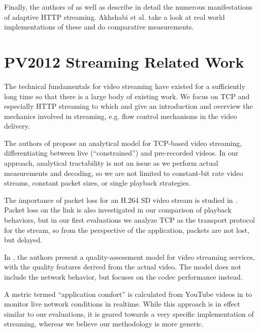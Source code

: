 Finally, the authors of \cite{ma2011mobile} as well as \cite{5677508} describe in detail the numerous manifestations of adaptive HTTP streaming. Akhshabi et al. \cite{akhshabi2011experimental} take a look at real world implementations of these and do comparative measurements.



\section{PV2012 Streaming Related Work}


The technical fundamentals for video streaming have existed for a sufficiently long time so that there is a large body of existing work. We focus on TCP and especially HTTP streaming to which \cite{watching-video1} and \cite{mobile-video} give an introduction and overview the mechanics involved in streaming, e.g. flow control mechanisms in the video delivery.


The authors of \cite{wang2003model} propose an analytical model for TCP-based video streaming, differentiating between live (``constrained'') and pre-recorded videos. In our approach, analytical tractability is not an issue as we perform actual measurements and decoding, so we are not limited to constant-bit rate video streams, constant packet sizes, or single playback strategies.

The importance of packet loss for an H.264 SD video stream is studied in \cite{pv2010loss}. Packet loss on the link is also investigated in our comparison of playback behaviors, but in our first evaluations we analyze TCP as the transport protocol for the stream, so from the perspective of the application, packets are not lost, but delayed.


In \cite{pv2010qoe}, the authors present a quality-assessment model for video streaming services, with the quality features derived from the actual video. The model does not include the network behavior, but focuses on the codec performance instead. 

A metric termed ``application comfort'' is calculated from YouTube videos in \cite{yomo} to monitor live network conditions in realtime. While this approach is in effect similar to our evaluations, it is geared towards a very specific implementation of streaming, whereas we believe our methodology is more generic.



